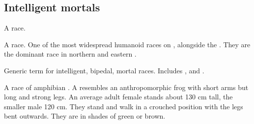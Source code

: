 \subsection{Intelligent mortals}
\begin{gloss}








\begin{comment}
\paragraph{\cregorr}
\end{comment}
\gitem[\cregorrs]{\cregorr}
A  race.









\begin{comment}
\paragraph{\human}
\end{comment}
\gitem{\human}
A  race. 
One of the most widespread humanoid races on \Miith{}, alongside the \scathae. 
They are the dominant race in northern and eastern . 









\begin{comment}
\paragraph{humanoid}
\end{comment}
Generic term for intelligent, bipedal, mortal races. 
Includes ,  and . 







\begin{comment}
\paragraph{\meccaran}
\end{comment}
\gitem[\meccara][\meccarans]{\meccaran}
A race of amphibian . 
A \meccaran{} resembles an anthropomorphic frog with short arms but long and strong legs. 
An average adult female stands about 130 cm tall, the smaller male 120 cm. 
They stand and walk in a crouched position with the legs bent outwards. 
They are \coloured in shades of green or brown. 


\end{gloss}
